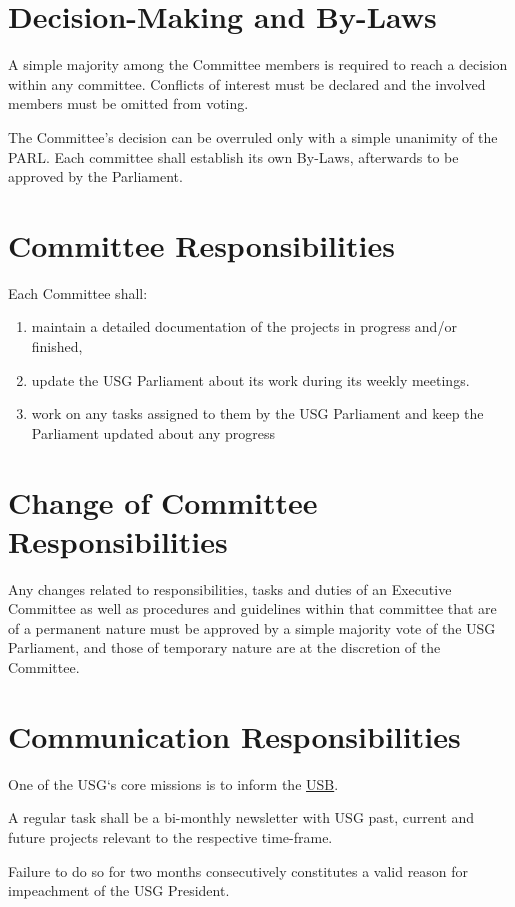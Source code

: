 	\section{Decision-Making and By-Laws} 
	A simple majority among the Committee members is required to reach a decision within any committee. Conflicts of interest must be declared and the involved members must be omitted from voting. 


	The Committee's decision can be overruled only with a simple unanimity of the \acl{PARL}. Each committee shall establish its own By-Laws, afterwards to be approved by the Parliament.
	\protect\section{Committee Responsibilities}
		Each Committee shall:
		\protect\begin{enumerate}
			\item maintain a detailed documentation of the projects in progress and/or finished,
			\item update the USG Parliament about its work during its weekly meetings.
			\protect\protect\item work on any tasks assigned to them by the USG Parliament and keep the Parliament updated about any progress
	\end{enumerate}

\protect\section{Change of Committee Responsibilities}
		Any changes related to responsibilities, tasks and duties of an Executive Committee as well as procedures and guidelines within that committee that are of a permanent nature must be approved by a simple majority vote of the USG Parliament, and those of temporary nature are at the discretion of the Committee.

	
	\protect\section{Communication Responsibilities}
	One of the USG`s core missions is to inform the \hyperref[studentbody]{USB}. 
	\protect\begin{parenum}
		\item A regular task shall be a bi-monthly newsletter with USG past, current and future projects relevant to the respective time-frame.
		\item Failure to do so for two months consecutively constitutes a valid reason for impeachment of the USG President.
	\end{parenum}

